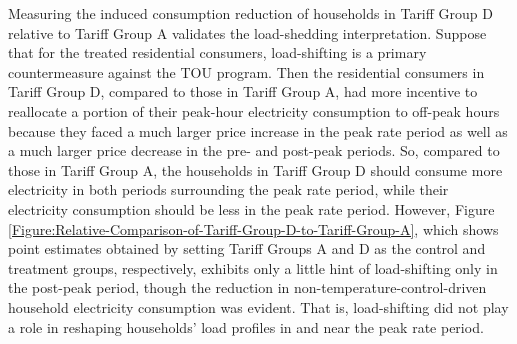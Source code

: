 Measuring the induced consumption reduction of households in Tariff Group D relative to Tariff Group A validates the load-shedding interpretation. Suppose that for the treated residential consumers, load-shifting is a primary countermeasure against the TOU program. Then the residential consumers in Tariff Group D, compared to those in Tariff Group A, had more incentive to reallocate a portion of their peak-hour electricity consumption to off-peak hours because they faced a much larger price increase in the peak rate period as well as a much larger price decrease in the pre- and post-peak periods. So, compared to those in Tariff Group A, the households in Tariff Group D should consume more electricity in both periods surrounding the peak rate period, while their electricity consumption should be less in the peak rate period. However, Figure \ref{Figure:Relative-Comparison-of-Tariff-Group-D-to-Tariff-Group-A}, which shows point estimates obtained by setting Tariff Groups A and D as the control and treatment groups, respectively, exhibits only a little hint of load-shifting only in the post-peak period, though the reduction in non-temperature-control-driven household electricity consumption was evident. That is, load-shifting did not play a role in reshaping households' load profiles in and near the peak rate period. 